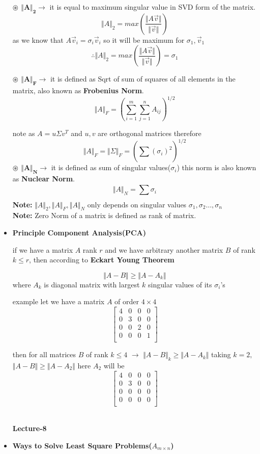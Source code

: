 \documentclass[a4paper]{article}
\numberwithin{equation}{section}
\begin{document}
\begin{itemize}
\textbf{$\circledast$ $\mathbf{\Vert A \Vert_2}\rightarrow$} it is equal to maximum singular value in SVD form of the matrix.
\[\Vert A \Vert_2=max\left(\frac{\Vert A\vec{v} \Vert}{\Vert \vec{v} \Vert}\right)\]
as we know that $A\vec{v}_i=\sigma_i \vec{v}_i$ so it will be maximum for $\sigma_1,\vec{v}_1$ 
\[\therefore \Vert A \Vert_2=max\left(\frac{\Vert A\vec{v} \Vert}{\Vert \vec{v} \Vert}\right)=\sigma_1\]

\textbf{$\circledast$ $\mathbf{\Vert A \Vert_F}\rightarrow$} it is defined as Sqrt of sum of squares of all elements in the matrix, also known as \textbf{Frobenius Norm}.
\[\Vert A \Vert_F=\left(\sum_{i=1}^{m}\sum_{j=1}^{n}A_{ij}\right)^{1/2}\]

note as $A=u\Sigma v^T$ and $u,v$ are orthogonal matrices therefore
\[\Vert A \Vert_F=\Vert \Sigma \Vert_F=\left(\sum_{}^{}(\sigma_i)^2\right)^{1/2}\]
\textbf{$\circledast$ $\mathbf{\Vert A \Vert_N}\rightarrow$} it is defined as sum of singular values($\sigma_i$) this norm is also known as \textbf{Nuclear Norm}.
\[\Vert A \Vert_N=\sum_{}^{}\sigma_i\]
\textbf{Note: }$\Vert A \Vert_2,\Vert A \Vert_F,\Vert A \Vert_N$ only depends on singular values $\sigma_1,\sigma_2\dots,\sigma_n$\\
\textbf{Note: }Zero Norm of a matrix is defined as rank of matrix.

\item \textbf{Principle Component Analysis(PCA)}

if we have a matrix $A$ rank $r$ and we have arbitrary another matrix $B$ of rank $k\leq r$, then according to \textbf{Eckart Young Theorem}

\[\boxed{\Vert A-B\Vert \geq \Vert A-A_k \Vert}\]
where $A_k$ is diagonal matrix with largest $k$ singular values of its $\sigma_i$'s 

example let we have a matrix $A$ of order $4\times 4$
\[\begin{bmatrix}
    4&0&0&0\\
    0&3&0&0\\
    0&0&2&0\\
    0&0&0&1\\
\end{bmatrix}\]

then for all matrices $B$ of rank $k\leq 4$ $\rightarrow$ $\Vert A-B\Vert_k \geq \Vert A-A_k\Vert$ taking $k=2,$ $\Vert A-B\Vert \geq \Vert A-A_2\Vert$ here $A_2$ will be 
\[\begin{bmatrix}
    4&0&0&0\\
    0&3&0&0\\
    0&0&0&0\\
    0&0&0&0\\
\end{bmatrix}\]
\\
\begin{center}
    \textbf{\Huge{Lecture-8}}
\end{center}
\item \textbf{Ways to Solve Least Square Problems($A_{m\times n}$)}


\end{itemize}
\end{document}

